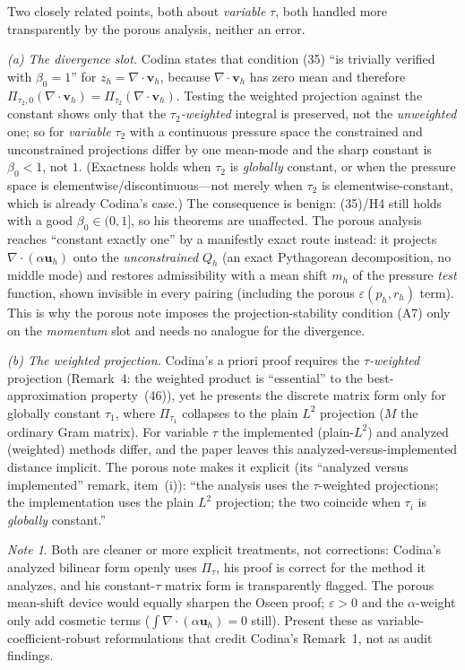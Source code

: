 \documentclass[11pt]{article}
\theoremstyle{remark}
\newtheorem*{note}{Note}
\newcommand{\bu}{\boldsymbol{u}}
\newcommand{\bv}{\boldsymbol{v}}
\begin{document}
Two closely related points, both about \emph{variable} $\tau$, both handled more transparently
by the porous analysis, neither an error.

\emph{(a) The divergence slot.} Codina states that condition (35) ``is trivially verified with
$\beta_0=1$'' for $z_h=\nabla\cdot\bv_h$, because $\nabla\cdot\bv_h$ has zero mean and
therefore $\Pi_{\tau_2,0}(\nabla\cdot\bv_h)=\Pi_{\tau_2}(\nabla\cdot\bv_h)$. Testing the
weighted projection against the constant shows only that the \emph{$\tau_2$-weighted} integral
is preserved, not the \emph{unweighted} one; so for \emph{variable} $\tau_2$ with a continuous
pressure space the constrained and unconstrained projections differ by one mean-mode and the
sharp constant is $\beta_0<1$, not $1$. (Exactness holds when $\tau_2$ is \emph{globally}
constant, or when the pressure space is elementwise/discontinuous---not merely when $\tau_2$ is
elementwise-constant, which is already Codina's case.) The consequence is benign: (35)/H4 still
holds with a good $\beta_0\in(0,1]$, so his theorems are unaffected. The porous analysis reaches
``constant exactly one'' by a manifestly exact route instead: it projects
$\nabla\cdot(\alpha\bu_h)$ onto the \emph{unconstrained} $Q_h$ (an exact Pythagorean
decomposition, no middle mode) and restores admissibility with a mean shift $m_h$ of the
pressure \emph{test} function, shown invisible in every pairing (including the porous
$\varepsilon(p_h,r_h)$ term). This is why the porous note imposes the projection-stability
condition (A7) only on the \emph{momentum} slot and needs no analogue for the divergence.

\emph{(b) The weighted projection.} Codina's a priori proof requires the \emph{$\tau$-weighted}
projection (Remark~4: the weighted product is ``essential'' to the best-approximation
property~(46)), yet he presents the discrete matrix form only for globally constant $\tau_1$,
where $\Pi_{\tau_1}$ collapses to the plain $L^2$ projection ($M$ the ordinary Gram matrix).
For variable $\tau$ the implemented (plain-$L^2$) and analyzed (weighted) methods differ, and
the paper leaves this analyzed-versus-implemented distance implicit. The porous note makes it
explicit (its ``analyzed versus implemented'' remark, item~(i)): ``the analysis uses the
$\tau$-weighted projections; the implementation uses the plain $L^2$ projection; the two
coincide when $\tau_i$ is \emph{globally} constant.''

\begin{note}
Both are cleaner or more explicit treatments, not corrections: Codina's analyzed bilinear
form openly uses $\Pi_\tau$, his proof is correct for the method it analyzes, and his
constant-$\tau$ matrix form is transparently flagged. The porous mean-shift device would
equally sharpen the Oseen proof; $\varepsilon>0$ and the $\alpha$-weight only add cosmetic
terms ($\int\nabla\cdot(\alpha\bu_h)=0$ still). Present these as variable-coefficient-robust
reformulations that credit Codina's Remark~1, not as audit findings.
\end{note}
\end{document}
